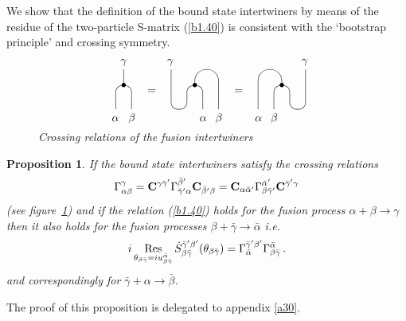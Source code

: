 \documentclass[a4paper,a4paper]{article}
\newtheorem{proposition}[theorem]{Proposition}
\begin{document}
We show that the definition of the bound state intertwiners by means of the
residue of the two-particle S-matrix (\ref{b1.40}) is consistent with the
`bootstrap principle' and crossing symmetry. 
\begin{figure}[tbh]
\[
\unitlength2.5mm%
\begin{picture}(25,7)
\put(2,1){\oval(2,6)[t]}
\put(2,4){\line(0,1){2}}
\put(2,4){\makebox(0,0){$\bullet$}}
\put(.5,-.5){$\alpha$}
\put(2.6,-.5){$\beta$}
\put(1.6,6.7){$\gamma$}
\put(5,3){$=$}
\put(8,2){\line(0,1){4}}
\put(9,2){\oval(2,2)[b]}
\put(11,2){\oval(2,4)[t]}
\put(12.5,4){\oval(3,4)[t]}
\put(12,1){\line(0,1){1}}
\put(14,1){\line(0,1){3}}
\put(11,4){\makebox(0,0){$\bullet$}}
\put(7.5,6.7){$\gamma$}
\put(13.6,-.5){$\beta$}
\put(11.6,-.5){$\alpha$}
\put(16,3){$=$}
\put(25,2){\line(0,1){4}}
\put(24,2){\oval(2,2)[b]}
\put(22,2){\oval(2,4)[t]}
\put(20.5,4){\oval(3,4)[t]}
\put(21,1){\line(0,1){1}}
\put(19,1){\line(0,1){3}}
\put(22,4){\makebox(0,0){$\bullet$}}
\put(24.5,6.7){$\gamma$}
\put(20.6,-.5){$\beta$}
\put(18.6,-.5){$\alpha$}
\end{picture}
\]
\caption{\textit{Crossing relations of the fusion intertwiners}}
\label{fb1}
\end{figure}

\begin{proposition}
\label{pb1}If the bound state intertwiners satisfy the crossing relations 
\begin{equation}
\Gamma _{\alpha \beta }^{\gamma }=\mathbf{C}^{\gamma \bar{\gamma}^{\prime
}}\Gamma _{\bar{\gamma}^{\prime }\alpha }^{\bar{\beta}^{\prime }}\mathbf{C}_{%
\bar{\beta}^{\prime }\beta }=\mathbf{C}_{\alpha \bar{\alpha}^{\prime
}}\Gamma _{\beta \bar{\gamma}^{\prime }}^{\bar{\alpha}^{\prime }}\mathbf{C}^{%
\bar{\gamma}^{\prime }\gamma }  \label{b1.70}
\end{equation}
(see figure~\ref{fb1}) and if the relation (\ref{b1.40}) holds for the
fusion process $\alpha +\beta \rightarrow \gamma $ then it also holds for
the fusion processes $\beta +\bar{\gamma}\rightarrow \bar{\alpha}$ i.e. 
\[
i\mathop{\rm Res}_{\theta _{\beta \bar{\gamma}}=iu_{\beta \bar{\gamma}}^{%
\bar{\alpha}}}\dot{S}_{\beta \bar{\gamma}}^{\bar{\gamma}^{\prime }\beta
^{\prime }}(\theta _{\beta \bar{\gamma}})=\Gamma _{\bar{\alpha}}^{\bar{\gamma%
}^{\prime }\beta ^{\prime }}\Gamma _{\beta \bar{\gamma}}^{\bar{\alpha}}\,. 
\]
and correspondingly for $\bar{\gamma}+\alpha \rightarrow \bar{\beta}$.
\end{proposition}

The proof of this proposition is delegated to appendix \ref{a30}.
\end{document}
